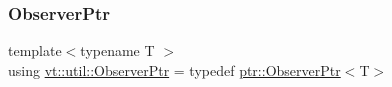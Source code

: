 \mbox{\label{namespacevt_1_1util_a7d480434049896696b9a50c38a766202}} 
\subsubsection{\texorpdfstring{Observer\+Ptr}{ObserverPtr}}
{\footnotesize\ttfamily template$<$typename T $>$ \\
using \hyperlink{namespacevt_1_1util_a7d480434049896696b9a50c38a766202}{vt\+::util\+::\+Observer\+Ptr} = typedef \hyperlink{structvt_1_1util_1_1ptr_1_1_observer_ptr}{ptr\+::\+Observer\+Ptr}$<$T$>$}


